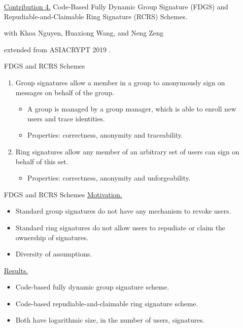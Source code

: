 \begin{frame}{}
	\underline{Contribution 4.} Code-Based Fully Dynamic Group Signature (FDGS) and Repudiable-and-Claimable Ring Signature (RCRS) Schemes.
	
	{\small with Khoa Nguyen, Huaxiong Wang, and Neng Zeng}
	
	extended from ASIACRYPT 2019 \cite{NguyenTWZ19}.
\end{frame}

\begin{frame}{FDGS and RCRS Schemes}
	\begin{enumerate}
		\item Group signatures allow a member in a group to anonymously sign on messages on behalf of the group.\pause
		\begin{itemize}
			\item A group is managed by a group manager, which is able to enroll new users and trace identities.\pause
			\item Properties: correctness, anonymity and traceability.\pause
		\end{itemize}
		\item Ring signatures allow any member of an arbitrary set of users can sign on behalf of this set.\pause
		\begin{itemize}
			\item Properties: correctness, anonymity and unforgeability.
		\end{itemize}
	\end{enumerate}
\end{frame}

\begin{frame}{FDGS and RCRS Schemes}
	\underline{Motivation.}\pause
	\begin{itemize}
		\item Standard group signatures do not have any mechanism to revoke users.\pause
		\item Standard ring signatures do not allow users to repudiate or claim the ownership of signatures.\pause
		\item Diversity of assumptions.\pause
	\end{itemize}
	\underline{Results.}\pause
	\begin{itemize}
		\item Code-based fully dynamic group signature scheme.\pause
		\item Code-based repudiable-and-claimable ring signature scheme.\pause
		\item Both have logarithmic size, in the number of users, signatures.
	\end{itemize}
\end{frame}

